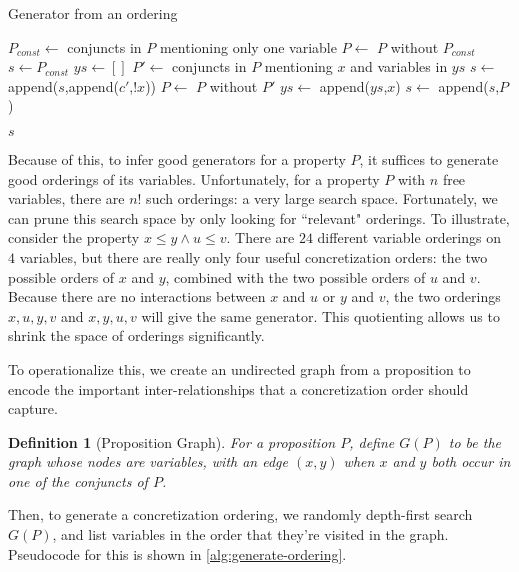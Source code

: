 \documentclass[10pt,a4paper]{article}
\newtheorem{definition}{Definition}
\begin{document}
\begin{algorithm}
    \caption{Generator from an ordering}
    \label{alg:fixed-ordering}
    \begin{algorithmic}
       \State $P_{const} \gets$ conjuncts in $P$ mentioning only one variable
       \State $P \gets$ $P$ without $P_{const}$
       \State $s \gets P_{const}$ 
       \State $ys \gets []$ 
         \State $P' \gets$ conjuncts in $P$ mentioning $x$ and variables in $ys$
         \State $s \gets$ append($s$,append($c'$,$!x$))
         \State $P \gets$ $P$ without $P'$
         \State $ys \gets$ append($ys$,$x$)
       \EndFor
       \State $s \gets$ append($s$,$P$)
       
       \Return $s$
      \EndFunction
    \end{algorithmic}
\end{algorithm}


Because of this, to infer good generators for a property $P$, it suffices to generate good orderings of its variables. Unfortunately, for a property $P$ with $n$ free variables, there are $n!$ such orderings: a very large search space. Fortunately, we can prune this search space by only looking for ``relevant" orderings. To illustrate, consider the property $x \leq y \wedge u \leq v$. There are $24$ different variable orderings on $4$ variables, but there are really only four useful concretization orders: the two possible orders of $x$ and $y$, combined with the two possible orders of $u$ and $v$. Because there are no interactions between $x$ and $u$ or $y$ and $v$, the two orderings $x,u,y,v$ and $x,y,u,v$ will give the same generator. This quotienting allows us to shrink the space of orderings significantly.

To operationalize this, we create an undirected graph from a proposition to encode the important inter-relationships that a concretization order should capture.

\begin{definition}[Proposition Graph]
For a proposition $P$, define $G(P)$ to be the graph whose nodes are variables, with an edge $(x,y)$ when $x$ and $y$ both occur in one of the conjuncts of $P$.
\end{definition}

Then, to generate a concretization ordering, we randomly depth-first search $G(P)$, and list variables in the order that they're visited in the graph. Pseudocode for this is shown in \autoref{alg:generate-ordering}.
\end{document}
